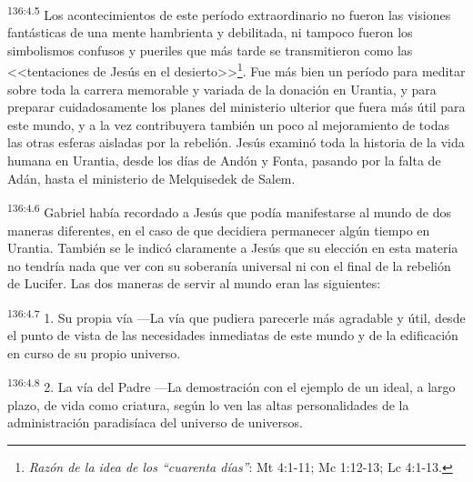 \par 
\textsuperscript{136:4.5} Los acontecimientos de este período extraordinario no fueron las visiones fantásticas de una mente hambrienta y debilitada, ni tampoco fueron los simbolismos confusos y pueriles que más tarde se transmitieron como las <<tentaciones de Jesús en el desierto>>\footnote{\textit{Razón de la idea de los ``cuarenta días''}: Mt 4:1-11; Mc 1:12-13; Lc 4:1-13.}. Fue más bien un período para meditar sobre toda la carrera memorable y variada de la donación en Urantia, y para preparar cuidadosamente los planes del ministerio ulterior que fuera más útil para este mundo, y a la vez contribuyera también un poco al mejoramiento de todas las otras esferas aisladas por la rebelión. Jesús examinó toda la historia de la vida humana en Urantia, desde los días de Andón y Fonta, pasando por la falta de Adán, hasta el ministerio de Melquisedek de Salem.

\par 
\textsuperscript{136:4.6} Gabriel había recordado a Jesús que podía manifestarse al mundo de dos maneras diferentes, en el caso de que decidiera permanecer algún tiempo en Urantia. También se le indicó claramente a Jesús que su elección en esta materia no tendría nada que ver con su soberanía universal ni con el final de la rebelión de Lucifer. Las dos maneras de servir al mundo eran las siguientes:

\par 
\textsuperscript{136:4.7} 1. Su propia vía ---La vía que pudiera parecerle más agradable y útil, desde el punto de vista de las necesidades inmediatas de este mundo y de la edificación en curso de su propio universo.

\par 
\textsuperscript{136:4.8} 2. La vía del Padre ---La demostración con el ejemplo de un ideal, a largo plazo, de vida como criatura, según lo ven las altas personalidades de la administración paradisíaca del universo de universos.


